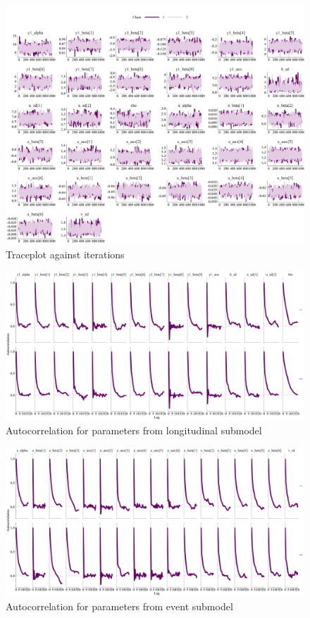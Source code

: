 \begin{figure}[H] 
\centering
\includegraphics[width=\textwidth]{Figures/Chp3_traceplot.jpg}
\caption{Traceplot against iterations}
\label{fig:trace}
\end{figure}

\begin{figure}[H] 
\centering
\includegraphics[width=\textwidth]{Figures/Chp3_acf_long.jpg}
\caption{Autocorrelation for parameters from longitudinal submodel}
\label{fig:acf_long}
\end{figure}

\begin{figure}[H] 
\centering
\includegraphics[width=\textwidth]{Figures/Chp3_acf_surv.jpg}
\caption{Autocorrelation for parameters from event submodel}
\label{fig:acf_surv}
\end{figure}


